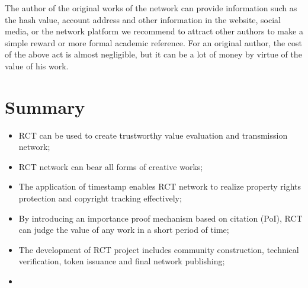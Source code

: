 \documentclass[a4paper,oneside,openany]{tufte-book}
\begin{document}
The author of the original works of the network can provide information such as the hash value, account address and other information in the website, social media, or the network platform we recommend to attract other authors to make a simple reward or more formal academic reference. For an original author, the cost of the above act is almost negligible, but it can be a lot of money by virtue of the value of his work.














\chapter{Summary}


\begin{itemize}
  \item RCT can be used to create trustworthy value evaluation and transmission network;
  \item RCT network can bear all forms of creative works;
  \item The application of timestamp enables RCT network to realize property rights protection and copyright tracking effectively;
  \item By introducing an importance proof mechanism based on citation (PoI), RCT can judge the value of any work in a short period of time;
  \item The development of RCT project includes community construction, technical verification, token issuance and final network publishing;
  \item \textsf{}



\end{itemize}
\end{document}
